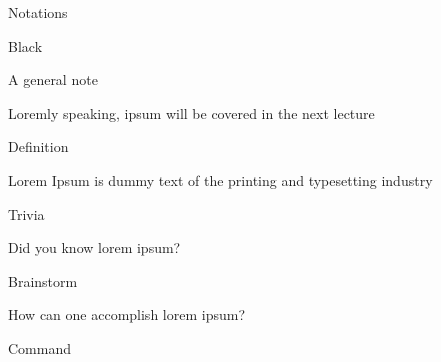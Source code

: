 \documentclass{MichiganTech}
\begin{document}
%
\begin{frame}[t]{Notations}
  \vspace*{0.10in}
  \begin{reference}{4mm}{85.5mm}{Black}
    \;
  \end{reference}

  \begin{beamerboxesrounded}[upper=generalnoteboxhead,lower=generalnoteboxbody,shadow=true]{A general note}
    \begin{flushleft}
      Loremly speaking, ipsum will be covered in the next lecture
    \end{flushleft}
  \end{beamerboxesrounded}

  \vspace*{0.075in}
  \begin{beamerboxesrounded}[upper=definitionboxhead,lower=definitionboxbody,shadow=true]{Definition}
    \begin{flushleft}
      Lorem Ipsum is dummy text of the printing and typesetting industry
    \end{flushleft}
  \end{beamerboxesrounded}

  \vspace*{0.075in}
  \begin{beamerboxesrounded}[upper=triviaboxhead,lower=triviaboxbody,shadow=true]{Trivia}
    \begin{flushleft}
      Did you know lorem ipsum?
    \end{flushleft}
  \end{beamerboxesrounded}

  \vspace*{0.075in}
  \begin{beamerboxesrounded}[upper=brainstormboxhead,lower=brainstormboxbody,shadow=true]{Brainstorm}
    \begin{flushleft}
      How can one accomplish lorem ipsum?
    \end{flushleft}
  \end{beamerboxesrounded}

  \vspace*{0.075in}
  \begin{beamerboxesrounded}[upper=commandboxhead,lower=commandboxbody,shadow=true]{Command}
    \begin{flushleft}
    \end{flushleft}
  \end{beamerboxesrounded}
\end{frame}
\end{document}
